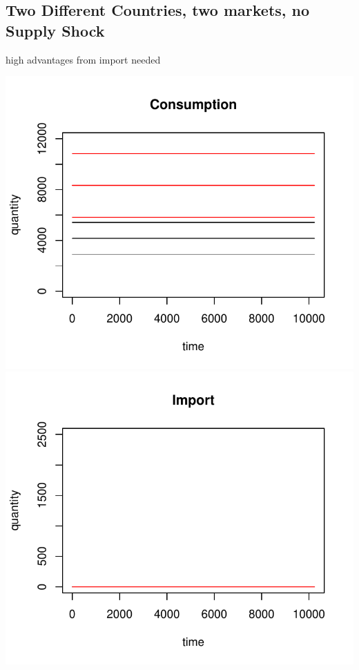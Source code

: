 \documentclass{article}
\begin{document}
\newpage
\subsection{Two Different Countries, two markets, no Supply Shock}
high advantages from import needed

\vskip2mm
\hskip-1cm
\includegraphics[scale=0.5]{fig_case01_consumption}
\includegraphics[scale=0.5]{fig_case01_import}
\end{document}
